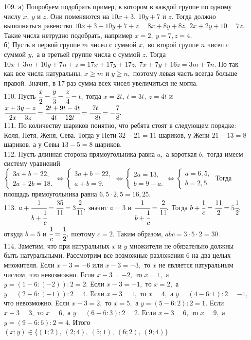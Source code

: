 \documentclass[12pt]{article}
\begin{document}
109. а) Попробуем подобрать пример, в котором в каждой группе по одному числу $x,\ y$ и $z.$ Они поменяются на $10x+3,\ 10y+7$ и $z.$ Тогда должно выполняться равенство $10x+3+10y+7+z=8x+8y+8z,\ 2x+2y+10=7z.$ Такие числа нетрудно подобрать, например $x=2,\ y=7, z=4.$\\
б) Пусть в первой группе $m$ чисел с суммой $x,$ во второй группе $n$ чисел с суммой $y,$ а в третьей группе числа с суммой $z.$ Тогда
$10x+3m+10y+7n+z=17x+17y+17z,\ 7x+7y+16z=3m+7n.$ Но так как все числа натуральны, $x\geqslant m$ и $y\geqslant n,$ поэтому левая часть всегда больше правой. Значит, в 17 раз сумма всех чисел увеличиться не могла.\\
110. Пусть $\cfrac{x}{2}=\cfrac{y}{3}=\cfrac{z}{4}=t,$ тогда $x=2t,\ t=3t,\ z=4t$ и $\cfrac{x+3y-z}{2x-3z}=\cfrac{2t+9t-4t}{4t-12t}=\cfrac{7t}{-8t}=-\cfrac{7}{8}.$\\
111. По количеству шариков понятно, что ребята стоят в следующем порядке: Коля, Петя, Женя, Сева. Тогда у Пети $32-21=11$ шариков, у Жени $21-13=8$ шариков, а у Севы $13-5=8$ шариков.\\
112. Пусть длинная сторона прямоугольника равна $a,$ а короткая $b,$ тогда имеем систему уравнений $\begin{cases} 3a+b=22,\\ 2a+2b=18.\end{cases}\Leftrightarrow
\begin{cases} 3a+b=22,\\ a+b=9.\end{cases}\Leftrightarrow
\begin{cases} 2a=13,\\ b=9-a.\end{cases}\Leftrightarrow
\begin{cases} a=6,5,\\ b=2,5.\end{cases}$ Тогда площадь прямоугольника равна $6,5\cdot2,5=16,25.$\\
113. $a+\cfrac{1}{b+\cfrac{1}{c}}=\cfrac{35}{11}=3\cfrac{2}{11},$ значит $a=3$ и $\cfrac{1}{b+\cfrac{1}{c}}=\cfrac{2}{11}.$ Тогда $b+\cfrac{1}{c}=\cfrac{11}{2}=5\cfrac{1}{2},$ откуда $b=5$ и $\cfrac{1}{c}=\cfrac{1}{2},$ поэтому $c=2.$ Таким образом, $abc=3\cdot5\cdot2=30.$\\
114. Заметим, что при натуральных $x$ и $y$ множители не обязательно должны быть натуральными. Рассмотрим все возможные разложения 6 на два целых множителя. Если $x-3=-6$ или $x-3=-3,$ то $x$ не является натуральным числом, что невозможно. Если $x-3=-2,$ то $x=1,$ а $y=(1-6:(-2)):2=2.$ Если $x-3=-1,$ то $x=2,$ а $y=(2-6:(-1)):2=4.$ Если $x-3=1,$ то $x=4,$ а $y=(4-6:1):2=-1,$ что невозможно. Если $x-3=2,$ то $x=5,$ а $y=(5-6:2):2=1.$ Если $x-3=3,$ то $x=6,$ а $y=(6-6:3):2=2.$ Если $x-3=6,$ то $x=9,$ а $y=(9-6:6):2=4.$ Итого $(x;y)\in\{(1;2),\ (2;4),\ (5;1),\ (6;2),\ (9;4)\}.$\\
\end{document}
